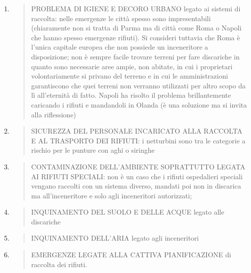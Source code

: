 \documentclass[]{article}
\begin{document}
\begin{enumerate}
\def\labelenumi{\arabic{enumi}.}
\item
  \begin{quote}
  PROBLEMA DI IGIENE E DECORO URBANO legato ai sistemi di raccolta:
  nelle emergenze le città spesso sono impresentabili (chiaramente non
  si tratta di Parma ma di città come Roma o Napoli che hanno spesso
  emergenze rifiuti). Si consideri tuttavia che Roma è l'unica capitale
  europea che non possiede un inceneritore a disposizione; non è sempre
  facile trovare terreni per fare discariche in quanto sono necessarie
  aree ampie, non abitate, in cui i proprietari volontariamente si
  privano del terreno e in cui le amministrazioni garantiscono che quei
  terreni non verranno utilizzati per altro scopo da lì all'eternità di
  fatto. Napoli ha risolto il problema brillantemente caricando i
  rifiuti e mandandoli in Olanda (è una soluzione ma si invita alla
  riflessione)
  \end{quote}
\item
  \begin{quote}
  SICUREZZA DEL PERSONALE INCARICATO ALLA RACCOLTA E AL TRASPORTO DEI
  RIFIUTI: i netturbini sono tra le categorie a rischio per le punture
  con aghi o siringhe
  \end{quote}
\item
  \begin{quote}
  CONTAMINAZIONE DELL'AMBIENTE SOPRATTUTTO LEGATA AI RIFIUTI SPECIALI:
  non è un caso che i rifiuti ospedalieri speciali vengano raccolti con
  un sistema diverso, mandati poi non in discarica ma all'inceneritore e
  solo agli inceneritori autorizzati;
  \end{quote}
\item
  \begin{quote}
  INQUINAMENTO DEL SUOLO E DELLE ACQUE legato alle discariche
  \end{quote}
\item
  \begin{quote}
  INQUINAMENTO DELL'ARIA legato agli inceneritori
  \end{quote}
\item
  \begin{quote}
  EMERGENZE LEGATE ALLA CATTIVA PIANIFICAZIONE di raccolta dei rifiuti.
  \end{quote}
\end{enumerate}
\end{document}
